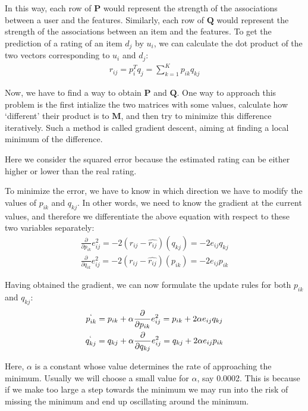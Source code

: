  In this way, each row of $\mathbf{P}$ would represent the strength of the associations between a user and the features. Similarly, each row of $\mathbf{Q}$ would represent the strength of the associations between an item and the features. To get the prediction of a rating of an item $d_j$ by $u_i$, we can calculate the dot product of the two vectors corresponding to $u_i$ and $d_j$:
  \begin{gather*}
    r_{ij} = p_i^{T}q_j = \sum_{k=1}^{K}p_{ik}q_{kj}
  \end{gather*}

 Now, we have to find a way to obtain $\mathbf{P}$ and $\mathbf{Q}$. One way to approach this problem is the first intialize the two matrices with some values, calculate how `different’ their product is to $\mathbf{M}$, and then try to minimize this difference iteratively. Such a method is called gradient descent, aiming at finding a local minimum of the difference.

 Here we consider the squared error because the estimated rating can be either higher or lower than the real rating.

 To minimize the error, we have to know in which direction we have to modify the values of $p_{ik}$ and $q_{kj}$. In other words, we need to know the gradient at the current values, and therefore we differentiate the above equation with respect to these two variables separately:
	\begin{gather*}
      \frac{\partial}{\partial p_{ik}}e_{ij}^2 = -2(r_{ij} - \widehat{r_{ij}})(q_{kj}) = -2e_{ij}q_{kj} \\
      \frac{\partial}{\partial q_{ik}}e_{ij}^2 = -2(r_{ij} - \widehat{r_{ij}})(p_{ik}) = -2e_{ij}p_{ik}
  \end{gather*}

 Having obtained the gradient, we can now formulate the update rules for both $p_{ik}$ and $q_{kj}$:
\begin{gather*}
      p^`_{ik} = p_{ik} + \alpha\frac{\partial}{\partial p_{ik}}e_{ij}^2 = p_{ik} + 2\alpha e_{ij}q_{kj} \\
      q^`_{kj} = q_{kj} + \alpha\frac{\partial}{\partial q_{kj}}e_{ij}^2 = q_{kj} + 2\alpha e_{ij}p_{ik}
  \end{gather*}

 Here, $\alpha$ is a constant whose value determines the rate of approaching the minimum. Usually we will choose a small value for $\alpha$, say 0.0002. This is because if we make too large a step towards the minimum we may run into the risk of missing the minimum and end up oscillating around the minimum.

